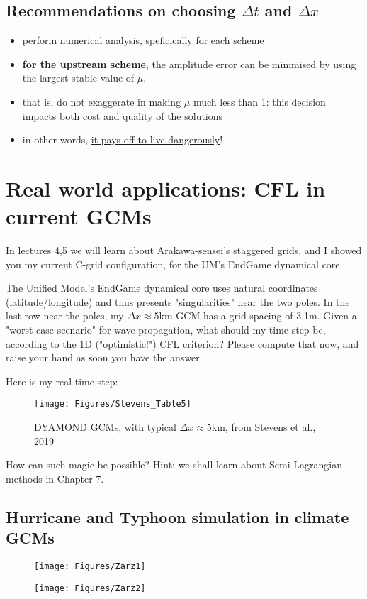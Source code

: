 \subsection{Recommendations on choosing $\Delta t$ and $\Delta x $}

	\begin{itemize}
		\item perform numerical analysis, speficically for each scheme
		\item \textbf{for the upstream scheme}, the amplitude error can be minimised by using the largest stable value of $\mu$.
		\item that is, do not exaggerate in making $\mu$ much less than 1: this decision impacts both cost and quality of the solutions
		\item in other words, \underline{it pays off to live dangerously}!
	\end{itemize}

\section{Real world applications: CFL in current GCMs}

In lectures 4,5 we will learn about Arakawa-sensei's staggered grids, and I showed you my current C-grid configuration, for the UM's EndGame dynamical core. \\

\begin{exercise}
The Unified Model's EndGame dynamical core uses natural coordinates (latitude/longitude) and thus presents "singularities" near the two poles. In the last row near the poles, my $\Delta x \approx 5$km GCM has a grid spacing of 3.1m. Given a "worst case scenario" for wave propagation, what should my time step be, according to the 1D ("optimistic!") CFL criterion? Please compute that now, and raise your hand as soon you have the answer.
\end{exercise}

Here is my real time step: 

\begin{figure}[h!]
	\texttt{[image: Figures/Stevens\_Table5]}
	\caption{DYAMOND GCMs, with typical $\Delta x \approx 5$km, from Stevens et al., 2019}
\end{figure}

How can such magic be possible? Hint: we shall learn about Semi-Lagrangian methods in Chapter 7.

\clearpage
\subsection{Hurricane and Typhoon simulation in climate GCMs}

\begin{figure}[h!]
\begin{center}	
	\texttt{[image: Figures/Zarz1]}
\end{center}
\end{figure}

\begin{figure}[h!]
\begin{center}	
	\texttt{[image: Figures/Zarz2]}
\end{center}
\end{figure}

